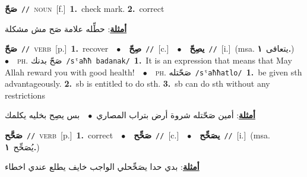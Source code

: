 \documentclass[10pt,a4paper,twoside]{article} %
\begin{document}
\begin{multicols}{2}
{\setlength\topsep{0pt}\textbf{\foreignlanguage{arabic}{صَحّ}}\ {\color{gray}\texttt{//}\color{black}}\ \textsc{noun}\ [f.]\ \textbf{1.}~check mark.  \textbf{2.}~correct\  \begin{flushright}\color{gray}\foreignlanguage{arabic}{\textbf{\underline{\foreignlanguage{arabic}{أمثلة}}}: حطِّله علامة صَح مش مشكلة}\end{flushright}\color{black}} \vspace{2mm}

{\setlength\topsep{0pt}\textbf{\foreignlanguage{arabic}{صَحّ}}\ {\color{gray}\texttt{//}\color{black}}\ \textsc{verb}\ [p.]\ \textbf{1.}~recover\ \ $\bullet$\ \ \setlength\topsep{0pt}\textbf{\foreignlanguage{arabic}{صِحّ}}\ {\color{gray}\texttt{//}\color{black}}\ [c.]\ \ $\bullet$\ \ \setlength\topsep{0pt}\textbf{\foreignlanguage{arabic}{يصِحّ}}\ {\color{gray}\texttt{//}\color{black}}\ [i.]\ \color{gray}(msa. \foreignlanguage{arabic}{يتعافى}~\foreignlanguage{arabic}{\textbf{١.}})\color{black}\ \ $\bullet$\ \ \textsc{ph.} \color{gray} \foreignlanguage{arabic}{صَحّ بدنك}\color{black}\ {\color{gray}\texttt{/{\sffamily sˤaħħ badanak}/}\color{black}}\ \textbf{1.}~It is an expression that means that May Allah reward you with good health!\ \ $\bullet$\ \ \textsc{ph.} \color{gray} \foreignlanguage{arabic}{صَحّتله}\color{black}\ {\color{gray}\texttt{/{\sffamily sˤaħħatlo}/}\color{black}}\ \textbf{1.}~be given sth advantageously.  \textbf{2.}~sb is entitled to do sth.  \textbf{3.}~sb can do sth without any restrictions\  \begin{flushright}\color{gray}\foreignlanguage{arabic}{\textbf{\underline{\foreignlanguage{arabic}{أمثلة}}}: أمين صَحّتله شروة أرض بتراب المصاري\ $\bullet$\ \  بس يصِح بخليه يكلمك}\end{flushright}\color{black}} \vspace{2mm}

{\setlength\topsep{0pt}\textbf{\foreignlanguage{arabic}{صَحَّح}}\ {\color{gray}\texttt{//}\color{black}}\ \textsc{verb}\ [p.]\ \textbf{1.}~correct\ \ $\bullet$\ \ \setlength\topsep{0pt}\textbf{\foreignlanguage{arabic}{صَحِّح}}\ {\color{gray}\texttt{//}\color{black}}\ [c.]\ \ $\bullet$\ \ \setlength\topsep{0pt}\textbf{\foreignlanguage{arabic}{يصَحِّح}}\ {\color{gray}\texttt{//}\color{black}}\ [i.]\ \color{gray}(msa. \foreignlanguage{arabic}{يُصَحِّح}~\foreignlanguage{arabic}{\textbf{١.}})\color{black}\  \begin{flushright}\color{gray}\foreignlanguage{arabic}{\textbf{\underline{\foreignlanguage{arabic}{أمثلة}}}: بدي حدا يصَحِّحلي الواجب خايف يطلع عندي اخطاء}\end{flushright}\color{black}} \vspace{2mm}


\end{multicols}
\end{document}
